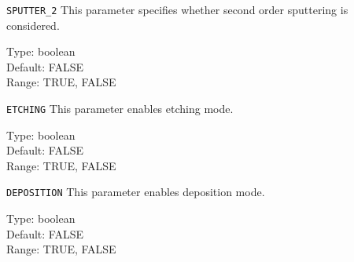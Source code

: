 \begin{keydescription}{\texttt{SPUTTER_2}}
This parameter specifies whether second order sputtering is considered.
\begin{keytab}
   Type:    \> boolean \\
   Default: \> FALSE \\
   Range:   \> TRUE, FALSE
\end{keytab}
\end{keydescription}

\begin{keydescription}{\texttt{ETCHING}}
This parameter enables etching mode.
\begin{keytab}
   Type:    \> boolean \\
   Default: \> FALSE \\
   Range:   \> TRUE, FALSE
\end{keytab}
\end{keydescription}

\begin{keydescription}{\texttt{DEPOSITION}}
This parameter enables deposition mode.
\begin{keytab}
   Type:    \> boolean \\
   Default: \> FALSE \\
   Range:   \> TRUE, FALSE
\end{keytab}
\end{keydescription}


